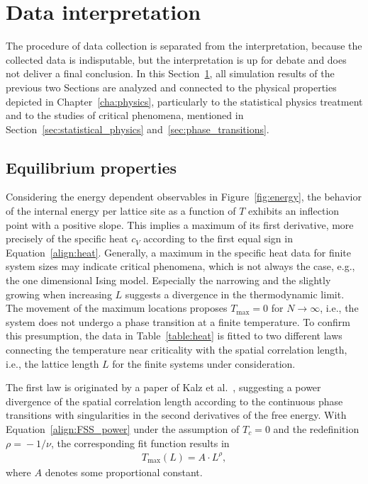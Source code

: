 
\section{Data interpretation}

\label{sec:discussion}

The procedure of data collection is separated from the interpretation, because the collected data is indisputable, but the interpretation is up for debate
and does not deliver a final conclusion. In this Section~\ref{sec:discussion}, all simulation results of the previous two Sections are analyzed and connected to the physical 
properties depicted in Chapter~\ref{cha:physics}, particularly to the statistical physics treatment and to the
studies of critical phenomena, mentioned in Section~\ref{sec:statistical_physics} and~\ref{sec:phase_transitions}.

\subsection*{Equilibrium properties}

Considering the energy dependent observables in Figure~\ref{fig:energy}, the behavior of the internal energy per lattice site as a function of $T$ exhibits 
an inflection point with a positive slope. This implies a maximum of its first derivative, more precisely of the specific heat $c_V$ according to the 
first equal sign in Equation~\eqref{align:heat}. Generally, a maximum in the specific heat data for finite system sizes may indicate critical phenomena,
which is not always the case, e.g., the one dimensional Ising model. Especially the narrowing and the slightly growing when increasing $L$ suggests a 
divergence in the thermodynamic limit. The movement of the maximum locations proposes $T_\mathrm{max}\!=\!0$ for $N\!\to\!\infty$, i.e., the system does not 
undergo a phase transition at a finite temperature. To confirm this presumption, the data in Table~\ref{table:heat} is fitted to two different laws 
connecting the temperature near criticality with the spatial correlation length, i.e., the lattice length $L$ for the finite systems under consideration.

The first law is originated by a paper of Kalz et al.~\cite{Kalz2008}, suggesting a power divergence of the spatial correlation length according to the 
continuous phase transitions with singularities in the second derivatives of the free energy. With Equation~\eqref{align:FSS_power} under the assumption 
of $T_c\!=\!0$ and the redefinition $\rho\!=\!-1/\nu$, the corresponding fit function results in
\begin{align*}
  T_\mathrm{max}(L)=A\cdot L^{\rho},
\end{align*}
where $A$ denotes some proportional constant. 

